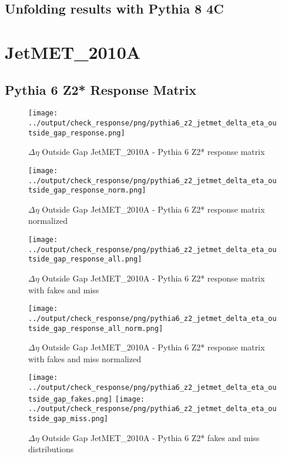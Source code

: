\documentclass[11pt]{book}
\begin{document}
\clearpage
\subsection{Unfolding results with Pythia 8 4C}


\section{JetMET\_2010A}
\subsection{Pythia 6 Z2* Response Matrix}

\begin{figure}[ht]
\centering
\texttt{[image: ../output/check\_response/png/pythia6\_z2\_jetmet\_delta\_eta\_outside\_gap\_response.png]}
\caption{$\Delta\eta$ Outside Gap JetMET\_2010A - Pythia 6 Z2* response matrix}
\label{p6_jetmet_delta_eta_outside_gap_response}
\end{figure}

\begin{figure}[ht]
\centering
\texttt{[image: ../output/check\_response/png/pythia6\_z2\_jetmet\_delta\_eta\_outside\_gap\_response\_norm.png]}
\caption{$\Delta\eta$ Outside Gap JetMET\_2010A - Pythia 6 Z2* response matrix normalized}
\label{p6_jetmet_delta_eta_outside_gap_response_norm}
\end{figure}

\begin{figure}[ht]
\centering
\texttt{[image: ../output/check\_response/png/pythia6\_z2\_jetmet\_delta\_eta\_outside\_gap\_response\_all.png]}
\caption{$\Delta\eta$ Outside Gap JetMET\_2010A - Pythia 6 Z2* response matrix with fakes and miss}
\label{p6_jetmet_delta_eta_outside_gap_response_all}
\end{figure}

\begin{figure}[ht]
\centering
\texttt{[image: ../output/check\_response/png/pythia6\_z2\_jetmet\_delta\_eta\_outside\_gap\_response\_all\_norm.png]}
\caption{$\Delta\eta$ Outside Gap JetMET\_2010A - Pythia 6 Z2* response matrix with fakes and miss normalized}
\label{p6_jetmet_delta_eta_outside_gap_response_all_norm}
\end{figure}

\begin{figure}[ht]
\centering
\texttt{[image: ../output/check\_response/png/pythia6\_z2\_jetmet\_delta\_eta\_outside\_gap\_fakes.png]}
\texttt{[image: ../output/check\_response/png/pythia6\_z2\_jetmet\_delta\_eta\_outside\_gap\_miss.png]}
\caption{$\Delta\eta$ Outside Gap JetMET\_2010A - Pythia 6 Z2* fakes and miss distributions}
\label{p6_jetmet_delta_eta_outside_gap_fakesmiss}
\end{figure}
\end{document}
